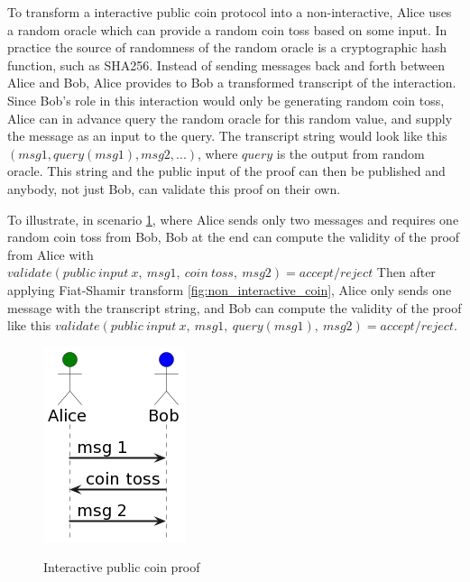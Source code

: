 \documentclass[conference,comsoc,10pt]{IEEEtran}
\begin{document}
        To transform a interactive public coin protocol into a non-interactive,
        Alice uses a random oracle which can provide a random coin toss based on some
        input. In practice the source of randomness of the random oracle is a
        cryptographic hash function, such as SHA256. Instead of sending messages back
        and forth between Alice and Bob, Alice provides to Bob a transformed
        transcript of the interaction. Since Bob's role in this interaction would only
        be generating random coin toss, Alice can in advance query the random oracle
        for this random value, and supply the message as an input to the query. The
        transcript string would look like this $(msg1, query(msg1), msg2, ...)$, where $query$ is
        the output from random oracle. This string and the public input of the proof
        can then be published and anybody, not just Bob, can validate this proof
        on their own.

        To illustrate, in scenario \ref{fig:interactive_coin}, where Alice
        sends only two messages and requires one random coin toss from Bob,
        Bob at the end can compute the validity of the proof from Alice with
        $validate(public\:input\:x,\:msg1,\:coin\:toss,\:msg2) = accept/reject$
        Then after applying Fiat-Shamir transform \ref{fig:non_interactive_coin},
        Alice only sends one message with the transcript string, and Bob can
        compute the validity of the proof like this
        $validate(public\:input\:x,\:msg1,\:query(msg1),\:msg2) = accept/reject$.

        \begin{figure}[h]
            \centering
            \includegraphics[scale=0.7]{../bachelor/assets/images/interactive_coin.png}
            \caption{Interactive public coin proof}
            \label{fig:interactive_coin}
            \cite{Goldwasser1986, youtubeMOOCLecture1}
            \vspace{0.5cm}
        \end{figure}
\end{document}

